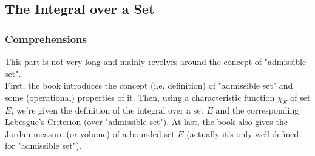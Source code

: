 \documentclass{Math_Note}
\begin{document}
\newpage
\subsection{The Integral over a Set}
\subsubsection{Comprehensions}
This part is not very long and mainly revolves around the concept of "admissible set". \\
First, the book introduces the concept (i.e. definition) of "admissible set" and some (operational) properties of it. Then, using a characteristic function $\chi_E$ of set $E$, we're 
given the definition of the integral over a set $E$ and the corresponding Lebesgue's Criterion (over "admissible set"). At last, the book also gives the Jordan  measure (or volume) 
of a bounded set $E$ (actually it's only well defined for "admissible set").
\newline\newline
{}
\newline
{}
\end{document}
